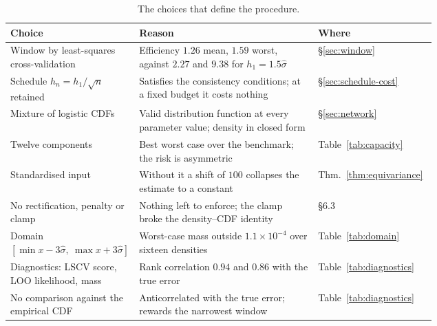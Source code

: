 \documentclass[11pt]{article}
\newcommand{\shat}{\hat{\sigma}}
\begin{document}
\begin{table}[H]
\centering
\begin{tabular}{@{}>{\raggedright\arraybackslash}p{0.30\linewidth}%
                  >{\raggedright\arraybackslash}p{0.42\linewidth}l@{}}
\toprule
\textbf{Choice} & \textbf{Reason} & \textbf{Where} \\
\midrule
Window by least-squares cross-validation &
  Efficiency $1.26$ mean, $1.59$ worst, against $2.27$ and $9.38$ for $h_1 = 1.5\shat$ &
  \S\ref{sec:window} \\
Schedule $h_n = h_1/\sqrt n$ retained &
  Satisfies the consistency conditions; at a fixed budget it costs nothing &
  \S\ref{sec:schedule-cost} \\
Mixture of logistic CDFs &
  Valid distribution function at every parameter value; density in closed form &
  \S\ref{sec:network} \\
Twelve components &
  Best worst case over the benchmark; the risk is asymmetric &
  Table~\ref{tab:capacity} \\
Standardised input &
  Without it a shift of $100$ collapses the estimate to a constant &
  Thm.~\ref{thm:equivariance} \\
No rectification, penalty or clamp &
  Nothing left to enforce; the clamp broke the density--CDF identity &
  \S6.3 \\
Domain $[\min x - 3\shat,\ \max x + 3\shat]$ &
  Worst-case mass outside $1.1 \times 10^{-4}$ over sixteen densities &
  Table~\ref{tab:domain} \\
Diagnostics: LSCV score, LOO likelihood, mass &
  Rank correlation $0.94$ and $0.86$ with the true error &
  Table~\ref{tab:diagnostics} \\
No comparison against the empirical CDF &
  Anticorrelated with the true error; rewards the narrowest window &
  Table~\ref{tab:diagnostics} \\
\bottomrule
\end{tabular}
\caption{The choices that define the procedure.}
\label{tab:decisions}
\end{table}
\end{document}
